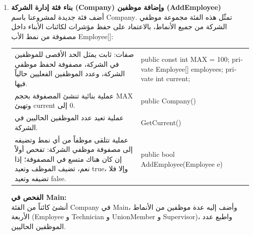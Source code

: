 \documentclass[14pt]{extarticle}
\begin{document}
\begin{enumerate}[label=\textbf{تمرين \arabic*:}, wide=0pt, itemsep=2.2em]
    \item \textbf{بناء فئة إدارة الشركة (\textenglish{Company}) وإضافة موظفين (\textenglish{AddEmployee})} \\
    أضف فئة جديدة لمشروعنا باسم \textenglish{Company}. تمثّل هذه الفئة مجموعة موظفي الشركة من جميع الأنماط، بالاعتماد على حفظ مؤشرات لكائنات الأبناء داخل مصفوفة من نمط الأب \textenglish{Employee[]}:

    {\renewcommand{\arraystretch}{1.2}
    \small
    \begin{longtable}{|>{\raggedleft\arraybackslash}p{}|>{\raggedright\arraybackslash}p{}|}
    \hline
    \multicolumn{2}{|c|}{\textbf{الفئة: \textenglish{Company}}} \\
    \hline
    صفات: ثابت يمثل الحد الأقصى للموظفين في الشركة، مصفوفة لحفظ موظفي الشركة، وعدد الموظفين الفعليين حالياً فيها. & \textenglish{public const int MAX = 100;} \newline \textenglish{private Employee[] employees;} \newline \textenglish{private int current;} \\
    \hline
    عملية بنائية تنشئ المصفوفة بحجم \textenglish{MAX} وتهيئ \textenglish{current} إلى $0$. & \textenglish{public Company()} \\
    \hline
    عملية تعيد عدد الموظفين الحاليين في الشركة. & \textenglish{GetCurrent()} \\
    \hline
    عملية تتلقى موظفاً من أي نمط وتضيفه إلى مصفوفة موظفي الشركة: تفحص أولاً إن كان هناك متسع في المصفوفة؛ إذا نعم، تضيف الموظف وتعيد \textenglish{true}، وإلا فلا تضيفه وتعيد \textenglish{false}. & \textenglish{public bool AddEmployee(Employee e)} \\
    \hline
    \end{longtable}}

    \vspace{1em}
    \noindent \textbf{الفحص في \textenglish{Main}:} \\
    أنشئ كائناً من الفئة \textenglish{Company} في \textenglish{Main}، وأضف إليه عدة موظفين من الأنماط الأربعة (\textenglish{Employee} و \textenglish{Technician} و \textenglish{UnionMember} و \textenglish{Supervisor})، واطبع عدد الموظفين الحاليين.
    \filbreak


\end{enumerate}
\end{document}
